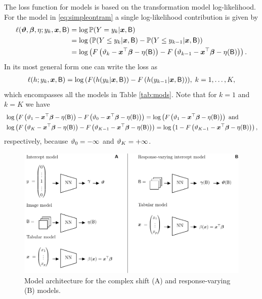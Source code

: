\documentclass[article,nojss,shortnames]{jss}\usepackage[]{graphicx}\usepackage[]{color}
\begin{document}
The loss function for  models is based on the transformation model
log-likelihood. For the model in \eqref{eq:simpleontram} a single log-likelihood
contribution is given by
\begin{align*}
  \ell(\text{\boldmath$\vartheta$}, \text{\boldmath$\beta$}, \eta ; y_k, \boldsymbol x, \mathsf{B})
  &= \log\mathbb{P}(Y = y_k \rvert \boldsymbol x, \mathsf{B}) \\
  &= \log\left(\mathbb{P}(Y \leq y_k \rvert \boldsymbol x, \mathsf{B}) - \mathbb{P}(Y \leq y_{k-1} \rvert \boldsymbol x, \mathsf{B})\right) \\
  &= \log\left(F\left(\vartheta_k - \boldsymbol x^\top\text{\boldmath$\beta$} - \eta(\mathsf{B})\right) -
    F\left(\vartheta_{k-1} - \boldsymbol x^\top\text{\boldmath$\beta$} - \eta(\mathsf{B})\right)\right).
\end{align*}
In its most general form one can write the  loss as
\begin{align*}
  \ell(h ; y_k, \boldsymbol x, \mathsf{B}) = \log\left(F(h(y_k \rvert \boldsymbol x, \mathsf{B})\right) -
    F\left(h(y_{k-1} \rvert \boldsymbol x, \mathsf{B})\right)), \; k = 1, \dots, K,
\end{align*}
which encompasses all the models in Table \ref{tab:mods}.
Note that for $k = 1$ and $k = K$ we have
\begin{align*}
  &\log\left(F\left(\vartheta_1 - \boldsymbol x^\top\text{\boldmath$\beta$} - \eta(\mathsf{B})\right) -
    F\left(\vartheta_{0} - \boldsymbol x^\top\text{\boldmath$\beta$} - \eta(\mathsf{B})\right)\right)
    = \log\left(F\left(\vartheta_1 - \boldsymbol x^\top\text{\boldmath$\beta$} - \eta(\mathsf{B})\right)\right) \mbox{ and} \\
  &\log\left(F\left(\vartheta_K - \boldsymbol x^\top\text{\boldmath$\beta$} - \eta(\mathsf{B})\right) -
    F\left(\vartheta_{K-1} - \boldsymbol x^\top\text{\boldmath$\beta$} - \eta(\mathsf{B})\right)\right)
    = \log\left(1 - F\left(\vartheta_{K-1} - \boldsymbol x^\top\text{\boldmath$\beta$} - \eta(\mathsf{B})\right)\right),
\end{align*}
respectively, because $\vartheta_0 = - \infty$ and $\vartheta_K = + \infty$.

\begin{figure}
\centering
\includegraphics[width=1\textwidth]{figures/ontram-architecture}
\caption{Model architecture for the complex shift (A) and response-varying (B)
 models.} \label{fig:ontram}
\end{figure}
\end{document}
